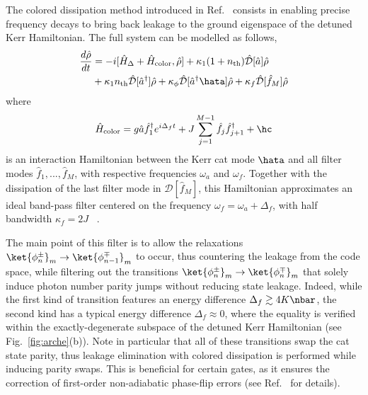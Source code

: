 The colored dissipation method introduced in Ref.~\cite{Putterman2022} consists in enabling precise frequency decays to bring back leakage to the ground eigenspace of the detuned Kerr Hamiltonian. The full system can be modelled as follows,
\begin{equation}
    \begin{split}
        \frac{d \hat \rho}{dt} &= -i[\hat H_\Delta + \hat H_\text{color},\hat \rho] + \kappa_1(1+n_{\text{th}}) \mathcal{\hat D}[\hat a]\hat \rho \\ 
        & + \kappa_1 n_{\text{th}} \mathcal{\hat D}[\hat{a}^{\dagger}]\hat \rho + \kappa_\phi \mathcal{\hat D}[\hat{a}^{\dagger} \hata]\hat \rho + \kappa_f \mathcal{\hat D}[\hat f_M]\hat \rho
        \label{eq:color}
    \end{split}
\end{equation}
where
\begin{equation}
        \hat H_\text{color} = g \hat a \hat f_1^\dagger e^{i\Delta_f t} + J \sum_{j=1}^{M-1}\hat f_j \hat f_{j+1}^\dagger + \hc
\end{equation}
is an interaction Hamiltonian between the Kerr cat mode $\hata$ and all filter modes $\hat f_1,...,\hat f_{M}$, with respective frequencies $\omega_a$ and $\omega_f$. Together with the dissipation of the last filter mode in $\mathcal{D}[\hat{f}_M]$, this Hamiltonian approximates an ideal band-pass filter centered on the  frequency $\omega_f=\omega_a+\Delta_f$, with half bandwidth $\kappa_f = 2J$ ~\cite{Putterman2022}.

The main point of this filter is to allow the relaxations $\ket{\phi_n^\pm}_m \rightarrow \ket{\phi_{n-1}^\mp}_m$ to occur, thus countering the leakage from the code space, while filtering out the transitions $\ket{\phi_n^\pm}_m \rightarrow \ket{\phi_n^\mp}_m$ that solely induce photon number parity jumps without reducing state leakage. Indeed, while the first kind of transition features an energy difference $\Delta_f \gtrsim 4K \nbar$, the second kind has a typical energy difference $\Delta_f \approx 0$, where the equality is verified within the exactly-degenerate subspace of the detuned Kerr Hamiltonian (see Fig.~\ref{fig:arche}(b)). Note in particular that all of these transitions swap the cat state parity, thus leakage elimination with colored dissipation is performed while inducing parity swaps. This is beneficial for certain gates, as it ensures the correction of first-order non-adiabatic phase-flip errors (see Ref.~\cite{Putterman2022} for details).

